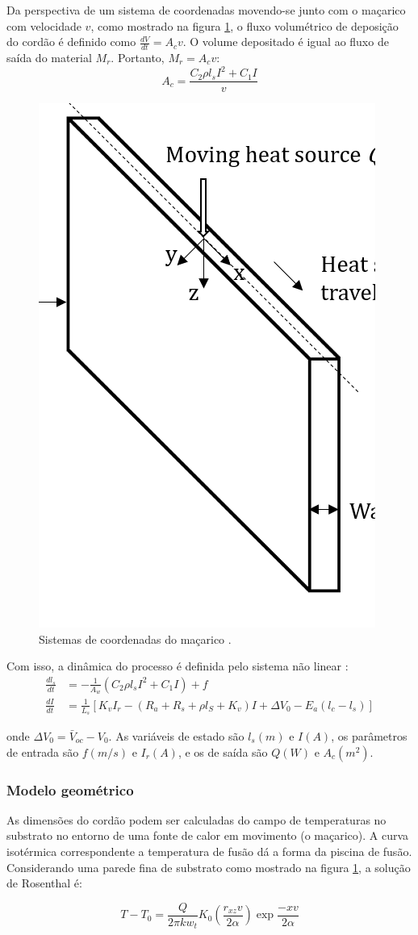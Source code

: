 Da perspectiva de um sistema de coordenadas movendo-se junto com o maçarico com velocidade $v$, como mostrado na figura \ref{fig:torch_coords}, o fluxo volumétrico de deposição do cordão é definido como $\frac{dV}{dt} = A_c v$. O volume depositado é igual ao fluxo de saída do material $M_r$. Portanto, $M_r = A_c v$:
\begin{equation}
    A_c = \frac{C_2\rho l_s I^2 + C_1 I}{v}
\end{equation}

\begin{figure}[hbt!]
    \centering
    \includegraphics[width=0.2\linewidth]{Imagens/chap02/torch_coords.png}
    \caption{Sistemas de coordenadas do maçarico \cite{bendia2021multivariable}.}
    \label{fig:torch_coords}
\end{figure}

Com isso, a dinâmica do processo é definida pelo sistema não linear \cite{bendia2021multivariable}:
\begin{align}
    \frac{dl_s}{dt} &=-\frac{1}{A_w}(C_2\rho l_s I^2 + C_1 I) + f \\
    \frac{dI}{dt} &= \frac{1}{L_s} [K_vI_r - (R_a+R_s+\rho l_S + K_v)I + \Delta V_0 -E_a(l_c-l_s)]
\end{align}

onde $\Delta V_0 = \bar{V}_{oc} - V_0$. As variáveis de estado são $l_s (m)$ e $I (A)$, os parâmetros de entrada são $f (m/s)$ e $I_r (A)$, e os de saída são $Q (W)$ e $A_c (m^2)$. 

\subsubsection{Modelo geométrico}
As dimensões do cordão podem ser calculadas do campo de temperaturas no substrato no entorno de uma fonte de calor em movimento (o maçarico). A curva isotérmica correspondente a temperatura de fusão dá a forma da piscina de fusão. Considerando uma parede fina de substrato como mostrado na figura \ref{fig:torch_coords}, a solução de Rosenthal é:

\begin{equation}
    T - T_0 = \frac{Q}{2\pi k w_t}K_0\left(\frac{r_{xz}v}{2\alpha}\right)\exp{\frac{-xv}{2\alpha}} \label{eq:rosenthal}
\end{equation}

